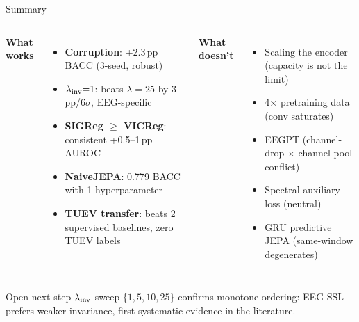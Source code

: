 \documentclass[aspectratio=169,10pt]{beamer}
\begin{document}
\begin{frame}{Summary}

\begin{columns}[T]
\textbf{\textcolor{good}{What works}}
\begin{itemize}
  \item \textbf{Corruption}: +2.3\,pp BACC (3-seed, robust)
  \item \textbf{$\lambda_{\rm inv}{=}1$}: beats $\lambda{=}25$ by 3\,pp/$6\sigma$, EEG-specific
  \item \textbf{SIGReg $\geq$ VICReg}: consistent +0.5--1\,pp AUROC
  \item \textbf{NaiveJEPA}: 0.779 BACC with 1 hyperparameter
  \item \textbf{TUEV transfer}: beats 2 supervised baselines, zero TUEV labels
\end{itemize}

\textbf{\textcolor{warn}{What doesn't}}
\begin{itemize}
  \item Scaling the encoder (capacity is not the limit)
  \item 4$\times$ pretraining data (conv saturates)
  \item EEGPT (channel-drop × channel-pool conflict)
  \item Spectral auxiliary loss (neutral)
  \item GRU predictive JEPA (same-window degenerates)
\end{itemize}
\end{columns}

\vspace{0.5em}
\begin{block}{Open next step}
$\lambda_{\rm inv}$ sweep $\{1,5,10,25\}$ confirms monotone ordering: EEG SSL prefers weaker invariance, first systematic evidence in the literature.
\end{block}
\end{frame}
\end{document}

